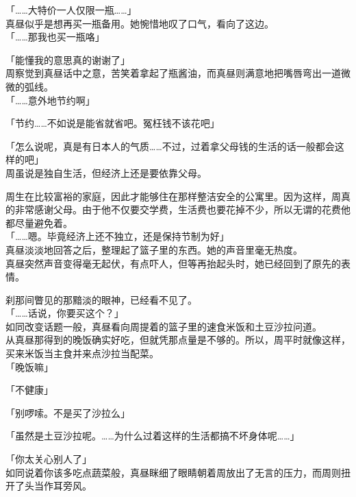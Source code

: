 「……大特价一人仅限一瓶……」\\

真昼似乎是想再买一瓶备用。她惋惜地叹了口气，看向了这边。\\

「……那我也买一瓶咯」

「能懂我的意思真的谢谢了」\\

周察觉到真昼话中之意，苦笑着拿起了瓶酱油，而真昼则满意地把嘴唇弯出一道微微的弧线。\\

「……意外地节约啊」

「节约……不如说是能省就省吧。冤枉钱不该花吧」

「怎么说呢，真是有日本人的气质……不过，过着拿父母钱的生活的话一般都会这样的吧」\\

周虽说是独自生活，但经济上还是要依靠父母。

周生在比较富裕的家庭，因此才能够住在那样整洁安全的公寓里。因为这样，周真的非常感谢父母。由于他不仅要交学费，生活费也要花掉不少，所以无谓的花费他都尽量避免着。\\

「……嗯。毕竟经济上还不独立，还是保持节制为好」\\

真昼淡淡地回答之后，整理起了篮子里的东西。她的声音里毫无热度。\\

真昼突然声音变得毫无起伏，有点吓人，但等再抬起头时，她已经回到了原先的表情。

刹那间瞥见的那黯淡的眼神，已经看不见了。\\

「……话说，你要买这个？」\\

如同改变话题一般，真昼看向周提着的篮子里的速食米饭和土豆沙拉问道。\\

从真昼那得到的晚饭确实好吃，但就凭那点量是不够的。所以，周平时就像这样，买来米饭当主食并来点沙拉当配菜。\\

「晚饭嘛」

「不健康」

「别啰嗦。不是买了沙拉么」

「虽然是土豆沙拉呢。……为什么过着这样的生活都搞不坏身体呢……」

「你太关心别人了」\\

如同说着你该多吃点蔬菜般，真昼眯细了眼睛朝着周放出了无言的压力，而周则扭开了头当作耳旁风。\\

